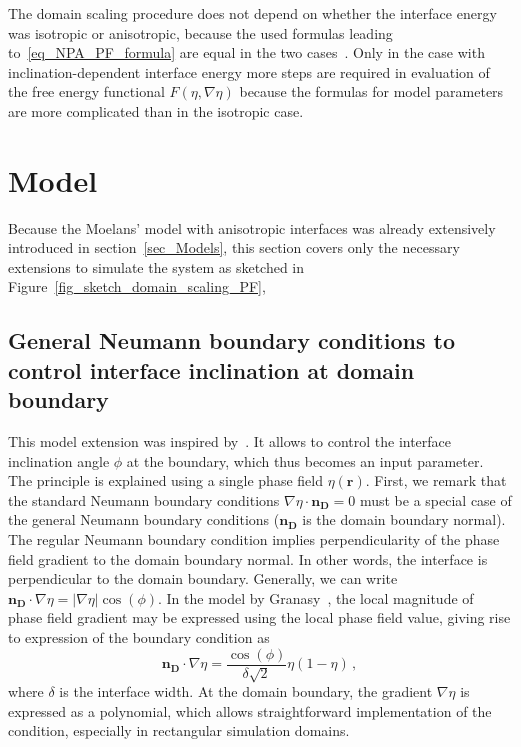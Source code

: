 The domain scaling procedure does not depend on whether the interface energy was isotropic or anisotropic, because the used formulas leading to~\eqref{eq_NPA_PF_formula} are equal in the two cases~\cite{Mariaux2011}. Only in the case with inclination-dependent interface energy more steps are required in evaluation of the free energy functional $F(\eta,\nabla\eta)$ because the formulas for model parameters are more complicated than in the isotropic case.

\section{Model}
Because the Moelans' model with anisotropic interfaces was already extensively introduced in section~\ref{sec_Models}, this section covers only the necessary extensions to simulate the system as sketched in Figure~\ref{fig_sketch_domain_scaling_PF}, 

	\subsection{General Neumann boundary conditions to control interface inclination at domain boundary}\label{sec_general_NBC_ch_NPA_PF}
	This model extension was inspired by~\cite{Granasy2007}. It allows to control the interface inclination angle $\phi$ at the boundary, which thus becomes an input parameter. The principle is explained using a single phase field $\eta(\bm{r})$. 
	First, we remark that the standard Neumann boundary conditions $\nabla\eta\cdot\bm{n_D}=0$ must be a special case of the general Neumann boundary conditions ($\bm{n_D}$ is the domain boundary normal). The regular Neumann boundary condition implies perpendicularity of the phase field gradient to the domain boundary normal. In other words, the interface is perpendicular to the domain boundary. Generally, we can write $\bm{n_D}\cdot \nabla\eta=|\nabla\eta|\cos(\phi)$. In the model by Granasy~\cite{Granasy2007}, the local magnitude of phase field gradient may be expressed using the local phase field value, giving rise to expression of the boundary condition as
	\begin{equation}
		\bm{n_D}\cdot \nabla\eta=\frac{\cos(\phi)}{\delta\sqrt{2}}\eta(1-\eta)\,,
	\end{equation}
	where $\delta$ is the interface width. At the domain boundary, the gradient $\nabla\eta$ is expressed as a polynomial, which allows straightforward implementation of the condition, especially in rectangular simulation domains.
	
